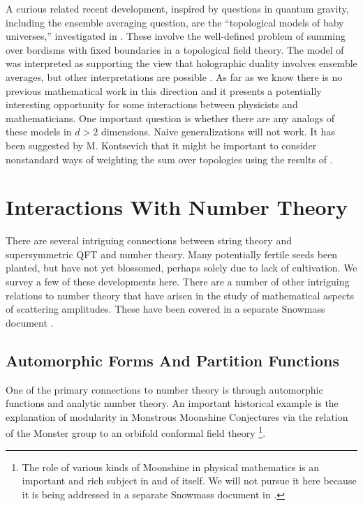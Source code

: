 \documentclass[12pt]{article}
\begin{document}
A curious related  recent development, 
inspired by questions in quantum gravity, including the 
ensemble averaging question, 
are the ``topological models of baby universes,'' investigated in
\cite{Balasubramanian:2020jhl,Banerjee:2022pmw,deMelloKoch:2021lqp,Gardiner:2020vjp,Marolf:2020xie}. These involve the well-defined problem of summing over bordisms with fixed
boundaries in a topological field theory.
The model of \cite{Marolf:2020xie} was interpreted as supporting the view that holographic duality involves ensemble averages, but other interpretations are possible \cite{Banerjee:2022pmw}.
As far as we know there is no previous mathematical work in this direction and it presents a potentially interesting opportunity for some interactions between physicists and mathematicians. One important question is whether there are any analogs of these models in $d>2$ dimensions. Naive generalizations will not work. It has been suggested by M. Kontsevich that it might be important to consider nonstandard ways of weighting the sum over topologies using the results of 
\cite{nariman2021finiteness}.









\section{Interactions With Number Theory}\label{sec:NumberTheory}

There are several
intriguing connections between string theory and supersymmetric QFT 
and number theory. Many potentially fertile seeds been planted, but have not
yet blossomed, perhaps solely due to lack of cultivation. 
We survey a few of these developments here. There are a number of other intriguing relations to number theory that have arisen in the study of mathematical aspects of scattering amplitudes. These have been covered in a separate Snowmass document \cite{Arkani-Hamed:2022rwr}.
 

\subsection{Automorphic Forms And Partition Functions}

One of the primary connections to number theory is through
automorphic functions and analytic number theory.
An important historical example is the
explanation of modularity in Monstrous Moonshine Conjectures via the
relation of the Monster group
to an orbifold conformal field theory \cite{Borcherds1,Borcherds2,Dixon:1988qd,FLM}
\footnote{The role of various kinds of Moonshine in physical mathematics
is an important and rich subject in and of itself. We will not pursue
it here because it is being addressed in a separate
Snowmass document in \cite{Harrison:2022zee}.}.
\end{document}
